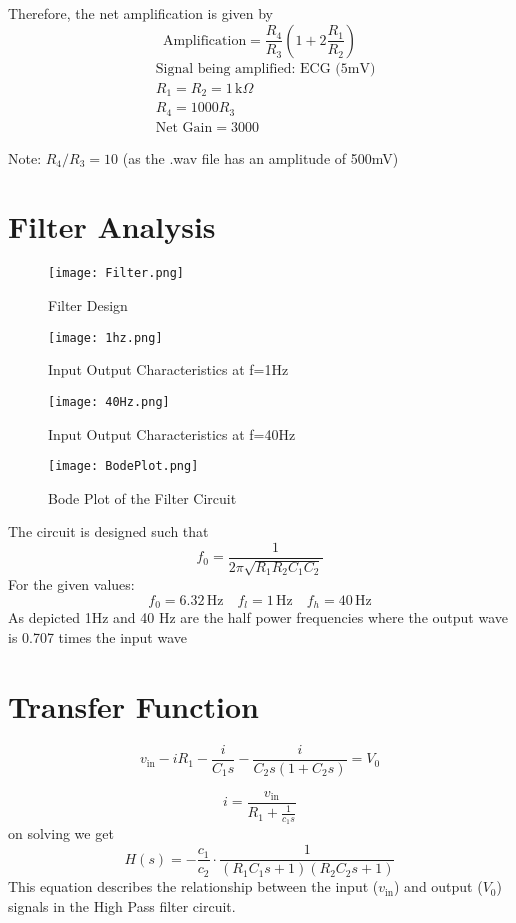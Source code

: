\documentclass{article}
\begin{document}
Therefore, the net amplification is given by
\[
\text{Amplification} = \frac{R_4}{R_3} \left(1 + 2 \frac{R_1}{R_2}\right)
\]
\begin{align*}
& \text{Signal being amplified: ECG (5mV)} \\
& R_1 = R_2 = 1 \, \text{k}\Omega \\
& R_4 = 1000R_3 \\
& \text{Net Gain} = 3000
\end{align*}

Note: \(R_4/R_3 = 10\) (as the .wav file has an amplitude of 500mV)
\newpage
\section{Filter Analysis}
\begin{figure}[h]
  \centering
  \texttt{[image: Filter.png]} 
  \caption{Filter Design}
  \label{fig:instrumentation-amp}
\end{figure}
\begin{figure}[h]
  \centering
  \texttt{[image: 1hz.png]} 
  \caption{Input Output Characteristics at f=1Hz}
  \label{fig:instrumentation-amp}
\end{figure}

\begin{figure}[h]
  \centering
  \texttt{[image: 40Hz.png]} 
  \caption{Input Output Characteristics at f=40Hz}
  \label{fig:instrumentation-amp}
\end{figure}

\begin{figure}[h]
  \centering
  \texttt{[image: BodePlot.png]} 
  \caption{Bode Plot of the Filter Circuit}
  \label{fig:instrumentation-amp}
\end{figure}
\newpage
The circuit is designed such that
\[
f_0 = \frac{1}{2\pi \sqrt{R_1 R_2 C_1 C_2}}
\]
For the given values:
\[
f_0 = 6.32 \, \text{Hz}
\quad
f_l = 1 \, \text{Hz}
\quad
f_h = 40 \, \text{Hz}
\]
As depicted 1Hz and 40 Hz are the half power frequencies where the output wave is 0.707 times the input wave
\section{Transfer Function}
\[
v_{\text{in}} - iR_1 - \frac{i}{C_1s} - \frac{i}{C_2s(1 + C_2s)} = V_0
\]

\[
i = \frac{v_{\text{in}}}{R_1+ \frac{1}{c_1s}} 
\]
on solving we get 
\[
H(s) = -\frac{c_1}{c_2} \cdot \frac{1}{(R_1C_1s + 1)(R_2C_2s + 1)}
\]
This equation describes the relationship between the input (\( v_{\text{in}} \)) and output (\( V_0 \)) signals in the High Pass filter circuit.
\end{document}
